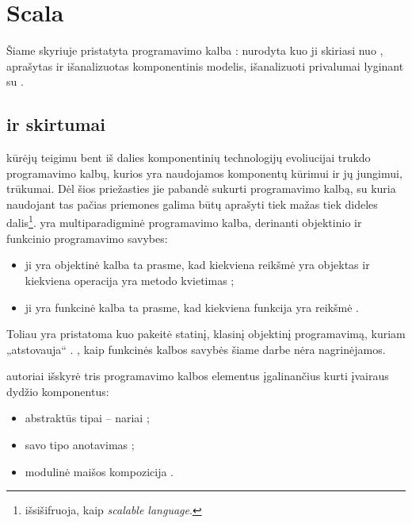 \chapter{Scala}

Šiame skyriuje pristatyta programavimo kalba :
nurodyta kuo ji skiriasi nuo , aprašytas
ir išanalizuotas  komponentinis modelis,
išanalizuoti  privalumai lyginant su .

\section{ ir  skirtumai}

 kūrėjų \cite[1]{scala-overview} teigimu bent iš
dalies komponentinių technologijų evoliucijai trukdo programavimo
kalbų, kurios yra naudojamos komponentų kūrimui ir jų jungimui,
trūkumai. Dėl šios priežasties jie pabandė sukurti programavimo
kalbą, su kuria naudojant tas pačias priemones galima būtų aprašyti
tiek mažas tiek dideles dalis\footnote{ išsišifruoja,
kaip \emph{scalable language}.}.  yra multiparadigminė
programavimo kalba, derinanti objektinio ir funkcinio programavimo
savybes:
\begin{itemize}
  \item ji yra objektinė kalba ta prasme, kad kiekviena reikšmė
     yra objektas ir kiekviena operacija yra metodo kvietimas
    \cite[3]{scala-overview};
  \item ji yra funkcinė kalba ta prasme, kad kiekviena funkcija yra
    reikšmė .
\end{itemize}
Toliau yra pristatoma kuo  pakeitė statinį, klasinį
objektinį programavimą, kuriam „atstovauja“ .
, kaip funkcinės kalbos savybės šiame darbe nėra
nagrinėjamos.

 autoriai \cite{scalable-component-abstractions}
išskyrė tris programavimo kalbos elementus įgalinančius kurti įvairaus
dydžio  komponentus:
\begin{itemize}
  \item abstraktūs tipai – nariai ;
  \item savo tipo anotavimas ;
  \item modulinė maišos kompozicija .
\end{itemize}

